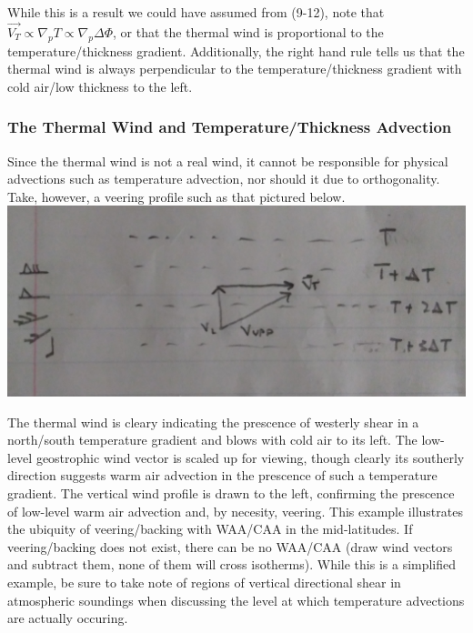 \documentclass[a4paper,12pt]{article}
\begin{document}
While this is a result we could have assumed from (9-12), note that $\vec{V_T} \propto \nabla_p T \propto \nabla_p \Delta \Phi$, or that the thermal wind is proportional to the temperature/thickness gradient. Additionally, the right hand rule tells us that the thermal wind is always perpendicular to the temperature/thickness gradient with cold air/low thickness to the left. 

\subsubsection*{The Thermal Wind and Temperature/Thickness Advection}

Since the thermal wind is not a real wind, it cannot be responsible for physical advections such as temperature advection, nor should it due to orthogonality. Take, however, a veering profile such as that pictured below.
\includegraphics[width = \textwidth]{thermal_wind_1}

The thermal wind is cleary indicating the prescence of westerly shear in a north/south temperature gradient and blows with cold air to its left. The low-level geostrophic wind vector is scaled up for viewing, though clearly its southerly direction suggests warm air advection in the prescence of such a temperature gradient. The vertical wind profile is drawn to the left, confirming the prescence of low-level warm air advection and, by necesity, veering. This example illustrates the ubiquity of veering/backing with WAA/CAA in the mid-latitudes. If veering/backing does not exist, there can be no WAA/CAA (draw wind vectors and subtract them, none of them will cross isotherms). While this is a simplified example, be sure to take note of regions of vertical directional shear in atmospheric soundings when discussing the level at which temperature advections are actually occuring. 
\end{document}
